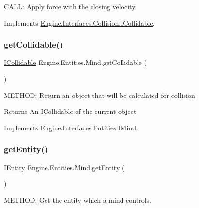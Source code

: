C\+A\+LL\+: Apply force with the closing velocity 

Implements \hyperlink{a00426_a000ca0336b06e3f2d658d442a83dbbbb}{Engine.\+Interfaces.\+Collision.\+I\+Collidable}.

\mbox{\label{a00318_aa36d6fcb8d80f1398855cea671ce1078}} 
\subsubsection{\texorpdfstring{get\+Collidable()}{getCollidable()}}
{\footnotesize\ttfamily \hyperlink{a00426}{I\+Collidable} Engine.\+Entities.\+Mind.\+get\+Collidable (\begin{DoxyParamCaption}{ }\end{DoxyParamCaption})\hspace{0.3cm}{\ttfamily [inline]}}



M\+E\+T\+H\+OD\+: Return an object that will be calculated for collision 

\begin{DoxyReturn}{Returns}
An I\+Collidable of the current object
\end{DoxyReturn}


Implements \hyperlink{a00446_a3cbff0e85b710a4c8737254ed9ca7b30}{Engine.\+Interfaces.\+Entities.\+I\+Mind}.

\mbox{\label{a00318_a9585d4438e12299a42aaed4ee6fb88b6}} 
\subsubsection{\texorpdfstring{get\+Entity()}{getEntity()}}
{\footnotesize\ttfamily \hyperlink{a00438}{I\+Entity} Engine.\+Entities.\+Mind.\+get\+Entity (\begin{DoxyParamCaption}{ }\end{DoxyParamCaption})\hspace{0.3cm}{\ttfamily [inline]}}



M\+E\+T\+H\+OD\+: Get the entity which a mind controls. 

